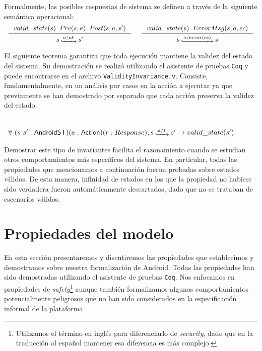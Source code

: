 Formalmente, las posibles respuestas de sistema se definen a través de la siguiente semántica
operacional:
\begin{displaymath}
    \begin{array}{c}
        \inference[]{$$valid\_state(s)$$ \hspace{.2cm} $$Pre(s, a)$$ \hspace{.2cm} $$Post(s, a, s')$$}{$$s\step{a/ok}s'$$}
        \hspace{0.5cm}
        \inference[]{$$valid\_state(s)$$ \hspace{.2cm} $$ErrorMsg(s, a, ec)$$}{$$s\step{a/error(ec)}s$$}
    \end{array}
\end{displaymath}

El siguiente teorema garantiza que toda ejecución mantiene la validez del estado del sistema. Su
demostración se realizó utilizando el asistente de pruebas \texttt{Coq} y puede encontrarse en el
archivo \texttt{ValidityInvariance.v}. Consiste, fundamentalmente, en un análisis por casos en la
acción a ejecutar ya que previamente se han demostrado por separado que cada acción preserva la
validez del estado.

\begin{theorem} 
    \label{lemma:valid-state-correct}
    \mbox{}\\
    $\begin{array}{l} \forall\ (s\ s':\AndroidState)(a:\Action) (r:Response), s\step{a/r}s'
            \rightarrow valid\_state(s')\end{array}$
\end{theorem}

Demostrar este tipo de invariantes facilita el razonamiento cuando se estudian otros comportamientos
más específicos del sistema. En particular, todas las propiedades que mencionamos a continuación
fueron probadas sobre estados válidos. De esta manera, infinidad de estados en los que la propiedad
no hubiese sido verdadera fueron automáticamente descartados, dado que no se trataban de escenarios
válidos.

\section{Propiedades del modelo}
\label{section:formalization:properties}

En esta sección presentaremos y discutiremos las propiedades que establecimos y demostramos sobre
nuestra formalización de Android. Todas las propiedades han sido demostradas utilizando el asistente
de pruebas \texttt{Coq}. Nos enfocamos en propiedades de \textit{safety}\footnote{Utilizamos el
    término en inglés para diferenciarlo de \textit{security}, dado que en la traducción al español
    mantener esa diferencia es más complejo.} aunque también formalizamos algunos comportamientos
potencialmente peligrosos que no han sido considerados en la especificación informal de la
plataforma.

